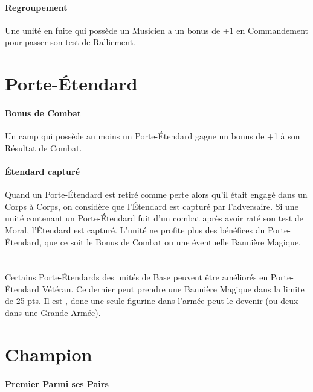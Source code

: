 \paragraph{Regroupement}

Une unité en fuite qui possède un Musicien a un bonus de +1 en Commandement pour passer son test de Ralliement.

\newpage
\section{Porte-Étendard}

\paragraph{Bonus de Combat}

Un camp qui possède au moins un Porte-Étendard gagne un bonus de +1 à son Résultat de Combat.

\paragraph{Étendard capturé}

Quand un Porte-Étendard est retiré comme perte alors qu'il était engagé dans un Corps à Corps, on considère que l'Étendard est capturé par l'adversaire. Si une unité contenant un Porte-Étendard fuit d'un combat après avoir raté son test de Moral, l'Étendard est capturé.  L'unité ne profite plus des bénéfices du Porte-Étendard, que ce soit le Bonus de Combat ou une éventuelle Bannière Magique.

\section[Porte-Étendard Vétéran]{}

Certains Porte-Étendards des unités de Base peuvent être améliorés en Porte-Étendard Vétéran. Ce dernier peut prendre une Bannière Magique dans la limite de 25 pts. Il est \oneofakind{}, donc une seule figurine dans l'armée peut le devenir (ou deux dans une Grande Armée).

\section{Champion}
\label{champion}

\paragraph{Premier Parmi ses Pairs}

